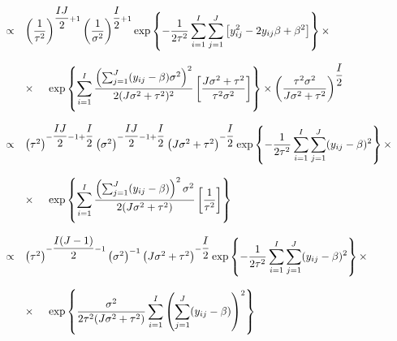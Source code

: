 \documentclass{article}
\begin{document}
\begin{equation*}
\begin{array}{lcl ll }

& \propto & \left(\dfrac{1}{\tau^2}\right)^{\dfrac{IJ}{2}+1} \left(\dfrac{1}{\sigma^2}\right)^{\dfrac{I}{2}+1}  \mbox{exp}\left\{ - \dfrac{1}{2\tau^2} \displaystyle\sum_{i=1}^{I}\sum_{j=1}^{J}\left[ y_{ij}^2 - 2y_{ij}\beta + \beta^2 \right] \right\} \times \\ \\

& & \times \hspace{0.5cm} \mbox{exp}\left\{\displaystyle\sum_{i=1}^{I}\dfrac{\left( \sum_{j=1}^{J} (y_{ij} - \beta)\sigma^2\right)^2}{2(J\sigma^2 + \tau^2)^2}  \left[ \dfrac{J\sigma^2 + \tau^2}{\tau^2\sigma^2} \right] \right\} \times \left(\dfrac{\tau^2\sigma^2}{J\sigma^2 + \tau^2}\right)^{\dfrac{I}{2}} \\\\

& \propto & \left(\tau^2\right)^{-\dfrac{IJ}{2}-1 +\dfrac{I}{2}} \left(\sigma^2\right)^{-\dfrac{IJ}{2}-1 +\dfrac{I}{2}} \left(J\sigma^2 + \tau^2\right)^{-\dfrac{I}{2}} \mbox{exp}\left\{ - \dfrac{1}{2\tau^2} \displaystyle\sum_{i=1}^{I}\sum_{j=1}^{J} (y_{ij} - \beta)^2 \right\} \times \\ \\

& & \times \hspace{0.5cm} \mbox{exp}\left\{ \displaystyle\sum_{i=1}^{I}\dfrac{\left( \sum_{j=1}^{J} (y_{ij} - \beta)\right)^2\sigma^2}{2(J\sigma^2 + \tau^2)}  \left[ \dfrac{1}{\tau^2} \right] \right\} \\\\


& \propto & \left(\tau^2\right)^{-\dfrac{I(J-1)}{2} -1} \left(\sigma^2\right)^{-1} \left(J\sigma^2 + \tau^2\right)^{-\dfrac{I}{2}}  \mbox{exp}\left\{ - \dfrac{1}{2\tau^2} \displaystyle\sum_{i=1}^{I}\sum_{j=1}^{J}(y_{ij} - \beta)^2 \right\} \times \\ \\

& & \times \hspace{0.5cm} \mbox{exp}\left\{ \dfrac{\sigma^2}{2\tau^2(J\sigma^2 + \tau^2)}\displaystyle\sum_{i=1}^{I}\left(\sum_{j=1}^{J} (y_{ij} - \beta)\right)^2 \right\}\\\\

 \end{array}
\end{equation*}
\end{document}
